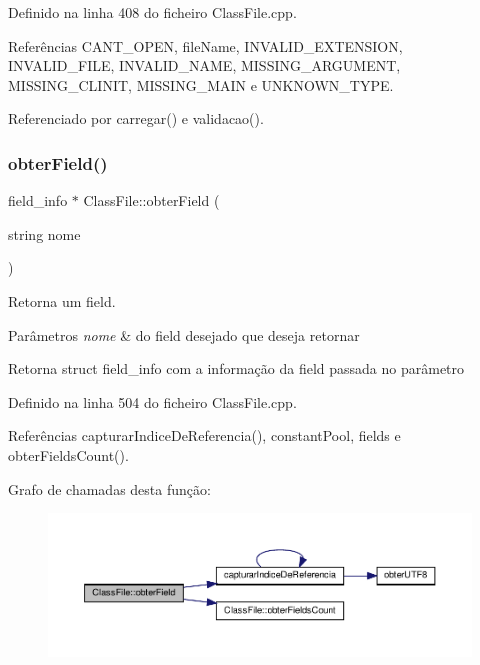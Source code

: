 Definido na linha 408 do ficheiro Class\+File.\+cpp.



Referências C\+A\+N\+T\+\_\+\+O\+P\+EN, file\+Name, I\+N\+V\+A\+L\+I\+D\+\_\+\+E\+X\+T\+E\+N\+S\+I\+ON, I\+N\+V\+A\+L\+I\+D\+\_\+\+F\+I\+LE, I\+N\+V\+A\+L\+I\+D\+\_\+\+N\+A\+ME, M\+I\+S\+S\+I\+N\+G\+\_\+\+A\+R\+G\+U\+M\+E\+NT, M\+I\+S\+S\+I\+N\+G\+\_\+\+C\+L\+I\+N\+IT, M\+I\+S\+S\+I\+N\+G\+\_\+\+M\+A\+IN e U\+N\+K\+N\+O\+W\+N\+\_\+\+T\+Y\+PE.



Referenciado por carregar() e validacao().

\mbox{\label{classClassFile_a1ae90b1662ca222c9910c14997b20eaa}} 
\subsubsection{\texorpdfstring{obter\+Field()}{obterField()}}
{\footnotesize\ttfamily field\+\_\+info $\ast$ Class\+File\+::obter\+Field (\begin{DoxyParamCaption}\item[{string}]{nome }\end{DoxyParamCaption})}



Retorna um field. 


\begin{DoxyParams}{Parâmetros}
{\em nome} & do field desejado que deseja retornar \\
\hline
\end{DoxyParams}
\begin{DoxyReturn}{Retorna}
struct field\+\_\+info com a informação da field passada no parâmetro 
\end{DoxyReturn}


Definido na linha 504 do ficheiro Class\+File.\+cpp.



Referências capturar\+Indice\+De\+Referencia(), constant\+Pool, fields e obter\+Fields\+Count().

Grafo de chamadas desta função\+:
\nopagebreak
\begin{figure}[H]
\begin{center}
\leavevmode
\includegraphics[width=350pt]{classClassFile_a1ae90b1662ca222c9910c14997b20eaa_cgraph}
\end{center}
\end{figure}
\mbox{\label{classClassFile_ac3aabaa918413884416692b29165b463}} 
